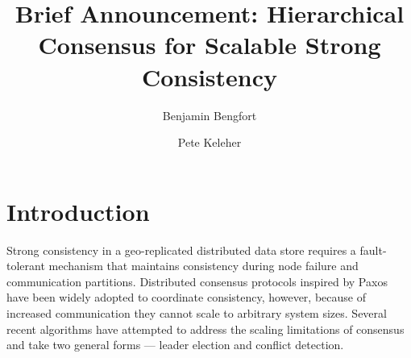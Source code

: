 \documentclass[11pt,letterpaper]{article}
\title{Brief Announcement: Hierarchical Consensus for Scalable Strong Consistency}
\date{}
\author[ ]{Benjamin Bengfort}
\author[ ]{Pete Keleher}
\affil[ ]{University of Maryland}
\affil[ ]{\textit{\{bengfort,keleher\}@cs.umd.edu}}
\begin{document}

\maketitle

\section{Introduction}

Strong consistency in a geo-replicated distributed data store requires a fault-tolerant
mechanism that maintains consistency during node failure and communication partitions.
Distributed consensus protocols inspired by Paxos \cite{lamport_paxos_2001} have been
widely adopted to coordinate consistency, however, because of increased communication
they cannot scale to arbitrary system sizes\cite{2016arXiv160806696H}.
Several recent algorithms have attempted to address the scaling limitations of consensus
and take two general forms --- leader election and conflict detection.
\end{document}
